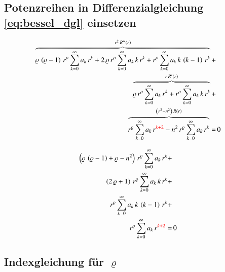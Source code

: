 \begin{refsection}
\subsection*{Potenzreihen in Differenzialgleichung \ref{eq:bessel_dgl} einsetzen}

\begin{align*}
	\overbrace{
		\varrho \, \left( \varrho - 1 \right) \, r^{\varrho}
		\sum_{k=0}^{\infty} a_k \, r^k
		+
		2 \, \varrho \, r^{\varrho}
		\sum_{k=0}^{\infty} a_k \, k \, r^k
		+
		r^{\varrho}
		\sum_{k=0}^{\infty} a_k \, k \, \left( k - 1 \right) \, r^k
	}^{r^2 \, R''\left( r \right)}
	+ \\
	\overbrace{
		\varrho \, r^{\varrho}
		\sum_{k=0}^{\infty} a_k \, r^k
		+
		r^{\varrho}
		\sum_{k=0}^{\infty} a_k \, k \, r^k
	}^{r \, R' \left( r \right)}
	+\\
	\overbrace{
	r^{\varrho}
		\sum_{k=0}^{\infty} a_k \, r^{\textcolor{red}{k + 2}}
		-
		n^2 \, r^{\varrho}
		\sum_{k=0}^{\infty} a_k \, r^k
	}^{\left( r^2 - n^2 \right) \, R \left( r \right)}
	= & \, 0
\end{align*}


\begin{align*}
	\left(
	\varrho \, \left( \varrho - 1 \right)
	+
	\varrho
	-
	n^2
	\right)
	\, r^{\varrho}
	\sum_{k=0}^{\infty} a_k \, r^k
	+ \\
	\left(	
	2 \, \varrho
	+
	1
	\right)
	\, r^{\varrho}
	\sum_{k=0}^{\infty} a_k \, k \, r^k
	+ \\
	r^{\varrho}
	\sum_{k=0}^{\infty} a_k \, k \, \left( k - 1 \right) \, r^k
	+ \\
	r^{\varrho}
	\sum_{k=0}^{\infty} a_k \, r^{\textcolor{red}{k + 2}}
	= & \, 0
\end{align*}

\subsection*{Indexgleichung f\"ur $\varrho$}



\end{refsection}
